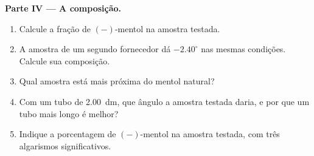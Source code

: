 \begin{problem}
\medskip
\noindent\textbf{Parte IV --- A composição.}
\begin{enumerate}[resume]
  \item Calcule a fração de $(-)$-mentol na amostra testada.
  \item A amostra de um segundo fornecedor dá $-2.40^\circ$ nas mesmas
        condições. Calcule sua composição.
  \item Qual amostra está mais próxima do mentol natural?
  \item Com um tubo de \qty{2.00}{dm}, que ângulo a amostra testada
        daria, e por que um tubo mais longo é melhor?
  \item Indique a porcentagem de $(-)$-mentol na amostra testada, com
        três algarismos significativos.
\end{enumerate}
\end{problem}
